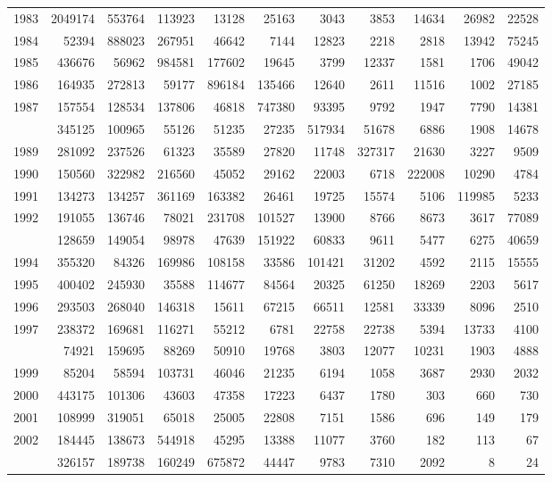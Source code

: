 \documentclass[
]{article}
\begin{document}
\begin{longtable}[t]{lrrrrrrrrrr}
1983 & 2049174 & 553764 & 113923 & 13128 & 25163 & 3043 & 3853 & 14634 & 26982 & 22528\\
1984 & 52394 & 888023 & 267951 & 46642 & 7144 & 12823 & 2218 & 2818 & 13942 & 75245\\
1985 & 436676 & 56962 & 984581 & 177602 & 19645 & 3799 & 12337 & 1581 & 1706 & 49042\\
1986 & 164935 & 272813 & 59177 & 896184 & 135466 & 12640 & 2611 & 11516 & 1002 & 27185\\
1987 & 157554 & 128534 & 137806 & 46818 & 747380 & 93395 & 9792 & 1947 & 7790 & 14381\\
\addlinespace
1988 & 345125 & 100965 & 55126 & 51235 & 27235 & 517934 & 51678 & 6886 & 1908 & 14678\\
1989 & 281092 & 237526 & 61323 & 35589 & 27820 & 11748 & 327317 & 21630 & 3227 & 9509\\
1990 & 150560 & 322982 & 216560 & 45052 & 29162 & 22003 & 6718 & 222008 & 10290 & 4784\\
1991 & 134273 & 134257 & 361169 & 163382 & 26461 & 19725 & 15574 & 5106 & 119985 & 5233\\
1992 & 191055 & 136746 & 78021 & 231708 & 101527 & 13900 & 8766 & 8673 & 3617 & 77089\\
\addlinespace
1993 & 128659 & 149054 & 98978 & 47639 & 151922 & 60833 & 9611 & 5477 & 6275 & 40659\\
1994 & 355320 & 84326 & 169986 & 108158 & 33586 & 101421 & 31202 & 4592 & 2115 & 15555\\
1995 & 400402 & 245930 & 35588 & 114677 & 84564 & 20325 & 61250 & 18269 & 2203 & 5617\\
1996 & 293503 & 268040 & 146318 & 15611 & 67215 & 66511 & 12581 & 33339 & 8096 & 2510\\
1997 & 238372 & 169681 & 116271 & 55212 & 6781 & 22758 & 22738 & 5394 & 13733 & 4100\\
\addlinespace
1998 & 74921 & 159695 & 88269 & 50910 & 19768 & 3803 & 12077 & 10231 & 1903 & 4888\\
1999 & 85204 & 58594 & 103731 & 46046 & 21235 & 6194 & 1058 & 3687 & 2930 & 2032\\
2000 & 443175 & 101306 & 43603 & 47358 & 17223 & 6437 & 1780 & 303 & 660 & 730\\
2001 & 108999 & 319051 & 65018 & 25005 & 22808 & 7151 & 1586 & 696 & 149 & 179\\
2002 & 184445 & 138673 & 544918 & 45295 & 13388 & 11077 & 3760 & 182 & 113 & 67\\
\addlinespace
2003 & 326157 & 189738 & 160249 & 675872 & 44447 & 9783 & 7310 & 2092 & 8 & 24\\

\end{longtable}
\end{document}
